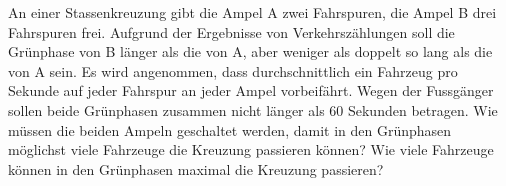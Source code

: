 \documentclass[%
11pt,%
twoside,%
titlepage,%
german,%
headsepline%
]{scrartcl}
\begin{document}
\begin{ueb}
An einer Stassenkreuzung gibt die Ampel A zwei Fahrspuren, die Ampel B drei Fahrspuren frei. Aufgrund der Ergebnisse von Verkehrsz\"ahlungen soll die Gr\"unphase von B l\"anger als die von A, aber weniger als doppelt so lang als die von A sein. Es wird angenommen, dass durchschnittlich ein Fahrzeug pro Sekunde auf jeder Fahrspur an jeder Ampel vorbeif\"ahrt. Wegen der Fussg\"anger sollen beide Gr\"unphasen zusammen nicht l\"anger als 60 Sekunden
betragen. Wie m\"ussen die beiden Ampeln geschaltet werden, damit in den Gr\"unphasen m\"oglichst viele Fahrzeuge die Kreuzung passieren k\"onnen? Wie viele Fahrzeuge k\"onnen in den Gr\"unphasen maximal die Kreuzung passieren?
\end{ueb}

\clearpage
\listoffigures
%
%
\end{document}
